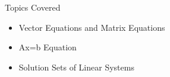 
 






\begin{frame}{Topics Covered}
  \begin{itemize}
    \item Vector Equations and Matrix Equations
    \item Ax=b Equation
    \item Solution Sets of Linear Systems
  \end{itemize}

\end{frame}




